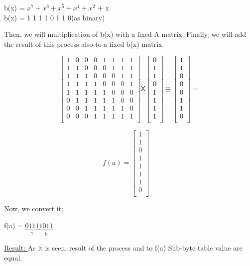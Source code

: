 \documentclass[11pt]{article}
\begin{document}
\begin{center}
  b(x) = $x^{7} + x^{6} + x^{5} + x^{4} + x^{2}$ + x\\
  \bigskip
  b(x) = 1 1 1 1 0 1 1 0(as binary)
\end{center}

Then, we will multiplication of b(x) with a fixed A matrix.  Finally, we will add the result of this process also to a fixed b(x) matrix.\\

\begin{center}
  \[
\begin{bmatrix}
  1& 0& 0& 0& 1& 1& 1& 1\\
  1& 1& 0& 0& 0& 1& 1& 1\\
  1& 1& 1& 0& 0& 0& 1& 1\\
  1& 1& 1& 1& 0& 0& 0& 1\\
  1& 1& 1& 1& 1& 0& 0& 0\\
  0& 1& 1& 1& 1& 1& 0& 0\\
  0& 0& 1& 1& 1& 1& 1& 0\\
  0& 0& 0& 1& 1& 1& 1& 1\\ 
\end{bmatrix}
\mathsf{X}
\begin{bmatrix}
  0\\
  1\\
  1\\
  0\\
  1\\
  1\\
  1\\
  1\\  
\end{bmatrix} 
\oplus 
\begin{bmatrix}
  1\\
  1\\
  0\\
  0\\
  0\\
  1\\
  1\\
  0\\ 
\end{bmatrix}
=
\]
\end{center}

\begin{center}
  $$f(a) = 
  \begin{bmatrix} 
   1\\
   1\\
   0\\
   1\\
   1\\
   1\\
   1\\
   0\\
  
  \end{bmatrix}
  \quad
  $$
\end{center}

Now, we convert it;\\

\begin{center}
  f(a) = $\underbrace{0 1 1 1}_\text{7} \underbrace{1 0 1 1}_\text{b}  $
\end{center}

\underline{Result: } As it is seen, result of the process and to f(a) Sub-byte table value are equal.
\end{document}
